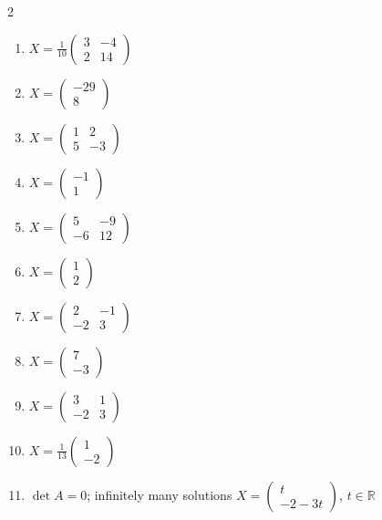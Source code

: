\begin{multicols}{2}
\begin{enumerate}[label=\arabic*., leftmargin=*, itemsep=1pt]
\item $X=\frac{1}{10}\left(\begin{smallmatrix}3 & -4\\ 2 & 14\end{smallmatrix}\right)$
\item $X=\left(\begin{smallmatrix}-29\\ 8\end{smallmatrix}\right)$
\item $X=\left(\begin{smallmatrix}1 & 2\\ 5 & -3\end{smallmatrix}\right)$
\item $X=\left(\begin{smallmatrix}-1\\ 1\end{smallmatrix}\right)$
\item $X=\left(\begin{smallmatrix}5 & -9\\ -6 & 12\end{smallmatrix}\right)$
\item $X=\left(\begin{smallmatrix}1\\ 2\end{smallmatrix}\right)$
\item $X=\left(\begin{smallmatrix}2 & -1\\ -2 & 3\end{smallmatrix}\right)$
\item $X=\left(\begin{smallmatrix}7\\ -3\end{smallmatrix}\right)$
\item $X=\left(\begin{smallmatrix}3 & 1\\ -2 & 3\end{smallmatrix}\right)$
\item $X=\frac{1}{13}\left(\begin{smallmatrix}1\\ -2\end{smallmatrix}\right)$
\item $\det A=0$; infinitely many solutions $X=\left(\begin{smallmatrix}t\\ -2-3t\end{smallmatrix}\right)$, $t\in\mathbb{R}$

\end{enumerate}
\end{multicols}
